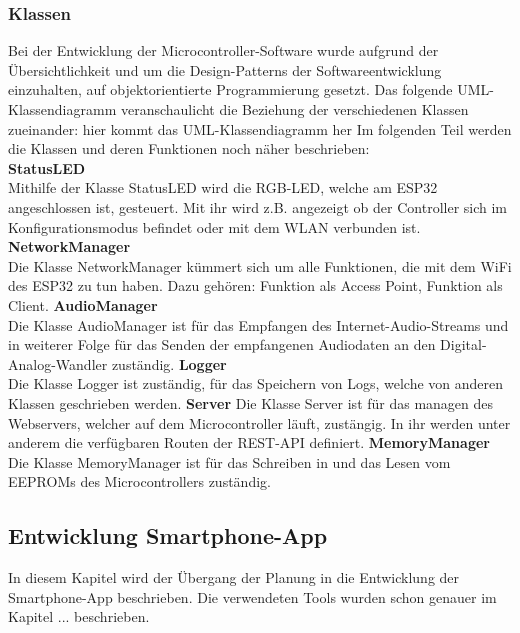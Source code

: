 \documentclass[]{article}
\begin{document}
\subsubsection{Klassen}
Bei der Entwicklung der Microcontroller-Software wurde aufgrund der Übersichtlichkeit und um die Design-Patterns der Softwareentwicklung einzuhalten, auf objektorientierte Programmierung gesetzt. Das folgende UML-Klassendiagramm veranschaulicht die Beziehung der verschiedenen Klassen zueinander:
hier kommt das UML-Klassendiagramm her
Im folgenden Teil werden die Klassen und deren Funktionen noch näher beschrieben:
\newline \\
\textbf{StatusLED} \\
Mithilfe der Klasse StatusLED wird die RGB-LED, welche am ESP32 angeschlossen ist, gesteuert. Mit ihr wird z.B. angezeigt ob der Controller sich im Konfigurationsmodus befindet oder mit dem WLAN verbunden ist.
\vspace{4mm}\newline
\textbf{NetworkManager} \\
Die Klasse NetworkManager kümmert sich um alle Funktionen, die mit dem WiFi des ESP32 zu tun haben. Dazu gehören: Funktion als Access Point, Funktion als Client.
\vspace{4mm}\newline
\textbf{AudioManager} \\
Die Klasse AudioManager ist für das Empfangen des Internet-Audio-Streams und in weiterer Folge für das Senden der empfangenen Audiodaten an den Digital-Analog-Wandler zuständig.
\vspace{4mm}\newline
\textbf{Logger} \\
Die Klasse Logger ist zuständig, für das Speichern von Logs, welche von anderen Klassen geschrieben werden. 
\vspace{4mm}\newline
\textbf{Server}
Die Klasse Server ist für das managen des Webservers, welcher auf dem Microcontroller läuft, zustängig. In ihr werden unter anderem die verfügbaren Routen der REST-API definiert.
\vspace{4mm}\newline
\textbf{MemoryManager}
Die Klasse MemoryManager ist für das Schreiben in und das Lesen vom EEPROMs des Microcontrollers zuständig.
\subsection{Entwicklung Smartphone-App}
In diesem Kapitel wird der Übergang der Planung in die Entwicklung der Smartphone-App beschrieben. Die verwendeten Tools wurden schon genauer im Kapitel ... beschrieben.
\end{document}
